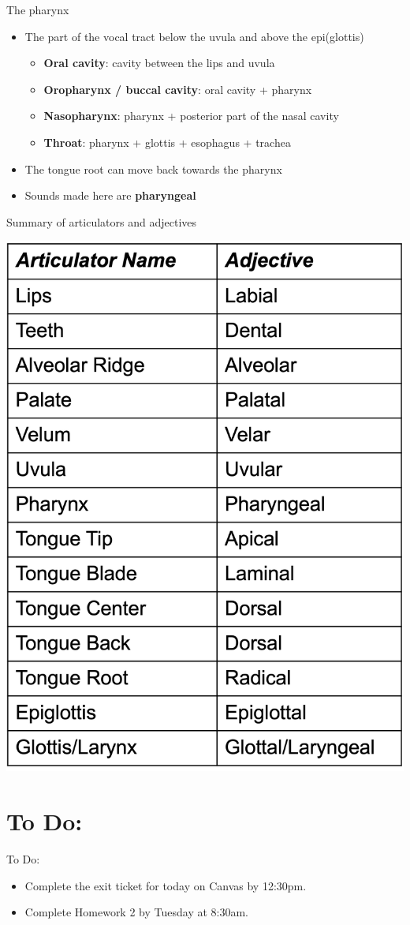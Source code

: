 \documentclass[professionalfonts]{beamer}
\begin{document}
\begin{frame}{The pharynx}
    \begin{itemize}
        \item The part of the vocal tract below the uvula and above the epi(glottis)
        \begin{itemize}
            \item \textbf{Oral cavity}: cavity between the lips and uvula
            \item \textbf{Oropharynx / buccal cavity}: oral cavity + pharynx
            \item \textbf{Nasopharynx}: pharynx + posterior part of the nasal cavity
            \item \textbf{Throat}: pharynx + glottis + esophagus + trachea
        \end{itemize}
        \item The tongue root can move back towards the pharynx
        \item Sounds made here are \textbf{pharyngeal}
    \end{itemize}
\end{frame}

\begin{frame}{Summary of articulators and adjectives}

    \begin{center}
        \includegraphics[width = 0.45\linewidth]{figs/Terminology.png}
    \end{center}

\end{frame}

\section*{To Do:}
\begin{frame}{To Do:}
    \begin{itemize}
        \item Complete the exit ticket for today on Canvas by 12:30pm.
        \item Complete Homework 2 by Tuesday at 8:30am.
    \end{itemize}
\end{frame}

\end{document}
